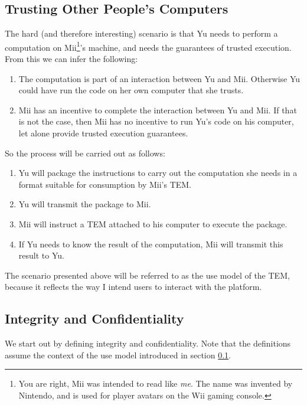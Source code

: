 \subsection{Trusting Other People's Computers}\label{concepts:use_model}
The hard (and therefore interesting) scenario is that Yu needs to perform a
computation on Mii\footnote{You are right, Mii was intended to read like
\textit{me}. The name was invented by Nintendo, and is used for player
avatars on the Wii gaming console.}'s machine, and needs the guarantees of
trusted execution. From this we can infer the following:

\begin{enumerate}
  \item {The computation is part of an interaction between Yu and Mii.}
  Otherwise Yu could have run the code on her own computer that she trusts.
  \item {Mii has an incentive to complete the interaction between Yu and Mii.} If
  that is not the case, then Mii has no incentive to run Yu's code on his
  computer, let alone provide trusted execution guarantees.
\end{enumerate}

So the process will be carried out as follows:
\begin{enumerate}
  \item Yu will package the instructions to carry out the computation she
  needs in a format suitable for consumption by Mii's TEM.
  \item Yu will transmit the package to Mii.
  \item Mii will instruct a TEM attached to his computer to execute the
  package.
  \item If Yu needs to know the result of the computation, Mii will transmit
  this result to Yu.
\end{enumerate}

The scenario presented above will be referred to as the use model of the TEM,
because it reflects the way I intend users to interact with the platform.

\subsection{Integrity and Confidentiality}\label{concepts:guarantees}

We start out by defining integrity and confidentiality. Note that the
definitions assume the context of the use model introduced in section
\ref{concepts:use_model}.


